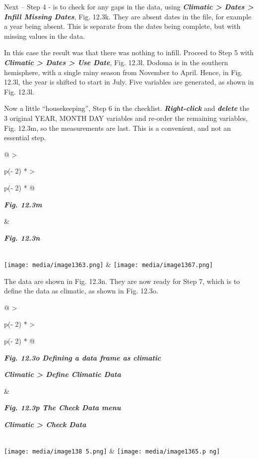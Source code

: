 \documentclass[
  letterpaper,
  DIV=11,
  numbers=noendperiod]{scrreprt}
\begin{document}
Next -- Step 4 - is to check for any gaps in the data, using
\textbf{\emph{Climatic \textgreater{} Dates \textgreater{} Infill
Missing Dates}}, Fig. 12.3k. They are absent dates in the file, for
example a year being absent. This is separate from the dates being
complete, but with missing values in the data.

In this case the result was that there was nothing to infill. Proceed to
Step 5 with \textbf{\emph{Climatic \textgreater{} Dates \textgreater{}
Use Date}}, Fig. 12.3l. Dodoma is in the southern hemisphere, with a
single rainy season from November to April. Hence, in Fig. 12.3l, the
year is shifted to start in July. Five variables are generated, as shown
in Fig. 12.3l.

Now a little ``housekeeping'', Step 6 in the checklist.
\textbf{\emph{Right-click}} and \textbf{\emph{delete}} the 3 original
YEAR, MONTH DAY variables and re-order the remaining variables, Fig.
12.3m, so the measurements are last. This is a convenient, and not an
essential step.

\begin{longtable}[]{@{}
  >{\raggedright\arraybackslash}p{(\columnwidth - 2\tabcolsep) * }
  >{\raggedright\arraybackslash}p{(\columnwidth - 2\tabcolsep) * }@{}}
\toprule\noalign{}
\begin{minipage}[b]{\linewidth}\raggedright
\textbf{\emph{Fig. 12.3m}}
\end{minipage} & \begin{minipage}[b]{\linewidth}\raggedright
\textbf{\emph{Fig. 12.3n}}
\end{minipage} \\
\midrule\noalign{}
\endhead
\bottomrule\noalign{}
\endlastfoot
\texttt{[image: media/image1363.png]}
&
\texttt{[image: media/image1367.png]} \\
\end{longtable}

The data are shown in Fig. 12.3n. They are now ready for Step 7, which
is to define the data as climatic, as shown in Fig. 12.3o.

\begin{longtable}[]{@{}
  >{\raggedright\arraybackslash}p{(\columnwidth - 2\tabcolsep) * }
  >{\raggedright\arraybackslash}p{(\columnwidth - 2\tabcolsep) * }@{}}
\toprule\noalign{}
\begin{minipage}[b]{\linewidth}\raggedright
\textbf{\emph{Fig. 12.3o Defining a data frame as climatic}}

\textbf{\emph{Climatic \textgreater{} Define Climatic Data}}
\end{minipage} & \begin{minipage}[b]{\linewidth}\raggedright
\textbf{\emph{Fig. 12.3p The Check Data menu}}

\textbf{\emph{Climatic \textgreater{} Check Data}}
\end{minipage} \\
\midrule\noalign{}
\endhead
\bottomrule\noalign{}
\endlastfoot
\texttt{[image: media/image138 5.png]}
&
\texttt{[image: media/image1365.p ng]} \\
\end{longtable}
\end{document}
